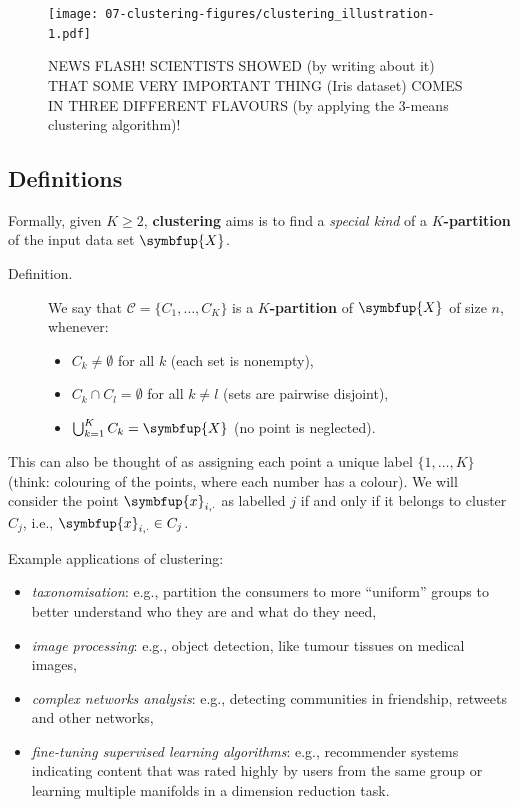 \documentclass[10pt,b5paper,krantz1]{krantz}
\providecommand{\tightlist}{%
  \setlength{\itemsep}{0pt}\setlength{\parskip}{0pt}}
\renewcommand{\mathbf}[1]{\symbfup{#1}}
\begin{document}
\begin{figure}
\hypertarget{fig:clustering_illustration}{%
\centering
\texttt{[image: 07-clustering-figures/clustering\_illustration-1.pdf]}
\caption{NEWS FLASH! SCIENTISTS SHOWED (by writing about it) THAT SOME VERY IMPORTANT THING (Iris dataset) COMES IN THREE DIFFERENT FLAVOURS (by applying the 3-means clustering algorithm)!}\label{fig:clustering_illustration}
}
\end{figure}

\hypertarget{definitions}{%
\subsection{Definitions}\label{definitions}}

Formally, given \(K\ge 2\), \textbf{clustering} aims is to find a \emph{special kind}
of a \textbf{\(K\)-partition} of the input data set \(\mathbf{X}\).

\begin{description}
\item[Definition.]
We say that \(\mathcal{C}=\{C_1,\dots,C_K\}\) is a \textbf{\(K\)-partition}
of \(\mathbf{X}\) of size \(n\),
whenever:

\begin{itemize}
\tightlist
\item
  \(C_k\neq\emptyset\) for all \(k\) (each set is nonempty),
\item
  \(C_k\cap C_l=\emptyset\) for all \(k\neq l\) (sets are pairwise disjoint),
\item
  \(\bigcup_{k=1}^K C_k=\mathbf{X}\) (no point is neglected).
\end{itemize}
\end{description}

This can also be thought of as assigning each point a unique label \(\{1,\dots,K\}\)
(think: colouring of the points, where each number has a colour).
We will consider the point \(\mathbf{x}_{i,\cdot}\) as labelled \(j\)
if and only if it belongs to cluster \(C_j\), i.e., \(\mathbf{x}_{i,\cdot}\in C_j\).

Example applications of clustering:

\begin{itemize}
\tightlist
\item
  \emph{taxonomisation}: e.g.,
  partition the consumers to more ``uniform''
  groups to better understand who they are and what do they need,
\item
  \emph{image processing}:
  e.g., object detection, like tumour tissues on medical images,
\item
  \emph{complex networks analysis}:
  e.g., detecting communities in friendship,
  retweets and other networks,
\item
  \emph{fine-tuning supervised learning algorithms}:
  e.g., recommender systems indicating content
  that was rated highly by users from the same group
  or learning multiple manifolds in a dimension reduction task.
\end{itemize}
\end{document}
